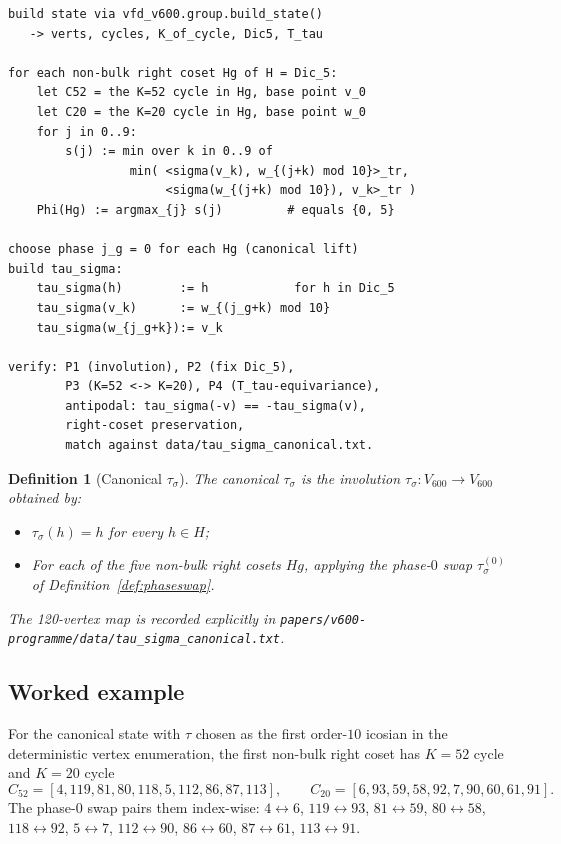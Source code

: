 \documentclass[11pt]{article}
\newtheorem{definition}{Definition}[section]
\newcommand{\Vsixhundred}{V_{600}}
\newcommand{\sigmaG}{\sigma}
\newcommand{\tausigma}{\tau_{\!\sigmaG}}
\newcommand{\tausigmaj}[1]{\tau^{(#1)}_{\!\sigmaG}}
\begin{document}
\begin{verbatim}
build state via vfd_v600.group.build_state()
   -> verts, cycles, K_of_cycle, Dic5, T_tau

for each non-bulk right coset Hg of H = Dic_5:
    let C52 = the K=52 cycle in Hg, base point v_0
    let C20 = the K=20 cycle in Hg, base point w_0
    for j in 0..9:
        s(j) := min over k in 0..9 of
                 min( <sigma(v_k), w_{(j+k) mod 10}>_tr,
                      <sigma(w_{(j+k) mod 10}), v_k>_tr )
    Phi(Hg) := argmax_{j} s(j)         # equals {0, 5}

choose phase j_g = 0 for each Hg (canonical lift)
build tau_sigma:
    tau_sigma(h)        := h            for h in Dic_5
    tau_sigma(v_k)      := w_{(j_g+k) mod 10}
    tau_sigma(w_{j_g+k}):= v_k

verify: P1 (involution), P2 (fix Dic_5),
        P3 (K=52 <-> K=20), P4 (T_tau-equivariance),
        antipodal: tau_sigma(-v) == -tau_sigma(v),
        right-coset preservation,
        match against data/tau_sigma_canonical.txt.
\end{verbatim}

\begin{definition}[Canonical $\tausigma$]\label{def:canonical}
The \emph{canonical $\tausigma$} is the involution
$\tausigma : \Vsixhundred \to \Vsixhundred$ obtained by:
\begin{itemize}[leftmargin=2em]
\item $\tausigma(h) = h$ for every $h \in H$;
\item For each of the five non-bulk right cosets $Hg$, applying the
phase-$0$ swap $\tausigmaj{0}$ of Definition~\ref{def:phaseswap}.
\end{itemize}
The 120-vertex map is recorded explicitly in
\texttt{papers/v600-programme/data/tau\_sigma\_canonical.txt}.
\end{definition}

\subsection{Worked example}

For the canonical state with $\tau$ chosen as the first
order-$10$ icosian in the deterministic vertex enumeration, the first
non-bulk right coset has $K=52$ cycle and $K=20$ cycle
\[
  C_{52} = [4, 119, 81, 80, 118, 5, 112, 86, 87, 113],\qquad
  C_{20} = [6, 93, 59, 58, 92, 7, 90, 60, 61, 91].
\]
The phase-$0$ swap pairs them index-wise:
$4 \leftrightarrow 6$, $119 \leftrightarrow 93$, $81 \leftrightarrow 59$,
$80 \leftrightarrow 58$, $118 \leftrightarrow 92$, $5 \leftrightarrow 7$,
$112 \leftrightarrow 90$, $86 \leftrightarrow 60$, $87 \leftrightarrow 61$,
$113 \leftrightarrow 91$.
\end{document}
